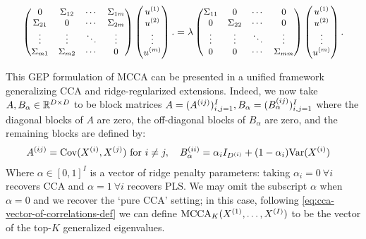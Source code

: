 \begin{align}
    \small
    \begin{pmatrix}
        0           & \Sigma_{12} & \cdots & \Sigma_{1m} \\
        \Sigma_{21} & 0           & \cdots & \Sigma_{2m} \\
        \vdots      & \vdots      & \ddots & \vdots      \\
        \Sigma_{m1} & \Sigma_{m2} & \cdots & 0
    \end{pmatrix}
    \begin{pmatrix}
        u^{(1)} \\
        u^{(2)} \\
        \vdots   \\
        u^{(m)}
    \end{pmatrix}.
    =
    \lambda
    \begin{pmatrix}
        \Sigma_{11} & 0           & \cdots & 0           \\
        0           & \Sigma_{22} & \cdots & 0           \\
        \vdots      & \vdots      & \ddots & \vdots      \\
        0           & 0           & \cdots & \Sigma_{mm}
    \end{pmatrix}
    \begin{pmatrix}
        u^{(1)} \\
        u^{(2)} \\
        \vdots   \\
        u^{(m)}
    \end{pmatrix}.
\end{align}

This GEP formulation of MCCA can be presented in a unified framework generalizing CCA and ridge-regularized extensions. Indeed, we now take $A,B_\alpha \in \mathbb{R}^{D \times D}$ to be block matrices $A = (A^{(ij)})_{i,j=1}^I, B_\alpha = (B_\alpha^{(ij)})_{i,j=1}^I$ where the diagonal blocks of $A$ are zero, the off-diagonal blocks of $B_\alpha$ are zero, and the remaining blocks are defined by:
\begin{align}
    \label{eq:gep-most-general-formulation}%
    A^{(ij)} &= \Cov(X\sps{i}, X\sps{j}) \text{ for } i \neq j, \quad %
    B_\alpha^{(ii)} = \alpha_i I_{D\sps{i}} + (1-\alpha_i) \Var(X\sps{i})  %
\end{align}
Where $\alpha \in [0,1]^I$ is a vector of ridge penalty parameters: taking $\alpha_i = 0 \: \forall i$ recovers CCA and $\alpha = 1 \: \forall i$ recovers PLS.
We may omit the subscript $\alpha$ when $\alpha=0$ and we recover the `pure CCA' setting; in this case, following \cref{eq:cca-vector-of-correlations-def} we can define $\operatorname{MCCA}_K(X^{(1)},\dots,X^{(I)})$ to be the vector of the top-$K$ generalized eigenvalues.

